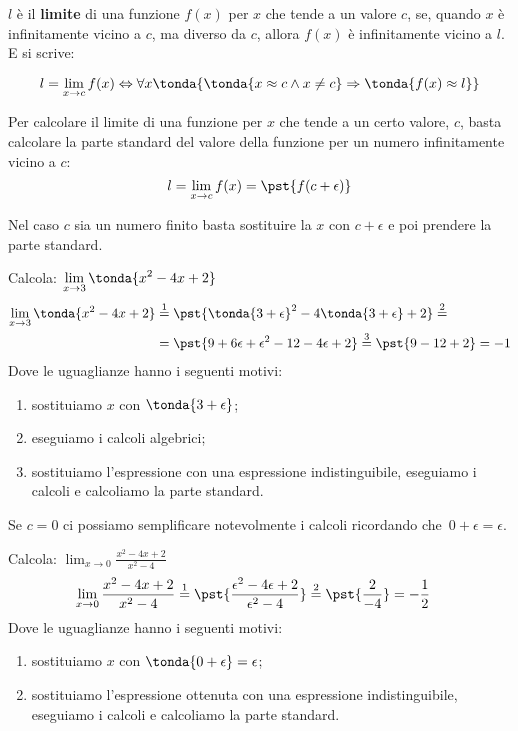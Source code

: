 \begin{definizione}
\(l\) è il \textbf{limite} di una funzione \(f(x)\) per \(x\) 
che tende a un 
valore \(c\), se, quando \(x\) è infinitamente vicino a \(c\), 
ma diverso da \(c\), 
allora \(f(x)\) è infinitamente vicino a \(l\). E si scrive:

\[l=\lim_{x \rightarrow c} f(x) \Leftrightarrow 
\forall x \tonda{\tonda{x \approx c \wedge x \neq c} \Rightarrow 
\tonda{f(x) \approx l}}\]
\end{definizione}

Per calcolare il limite di una funzione per $x$ che tende a un certo 
valore, $c$, basta calcolare la parte standard del valore della funzione 
per un numero infinitamente vicino a $c$:
\[l=\lim_{x \rightarrow c} f(x) = \pst{f(c+\epsilon)}\]

Nel caso $c$ sia un numero finito basta sostituire la $x$ con $c+\epsilon$ 
e poi prendere la parte standard.

\begin{esempio}
Calcola: \quad \(\displaystyle \lim_{x \rightarrow 3} \tonda{x^2-4x+2}\)
\begin{align*}
\lim_{x \rightarrow 3} \tonda{x^2-4x+2} & \stackrel{1}{=} 
  \pst{\tonda{3+\epsilon}^2-4\tonda{3+\epsilon}+2} \stackrel{2}{=}\\  
  & =\pst{9 + 6 \epsilon + \epsilon^2 - 12 - 4\epsilon + 2} \stackrel{3}{=}
  \pst{9 - 12 + 2} = -1
\end{align*}
Dove le uguaglianze hanno i seguenti motivi:
\begin{enumerate} [nosep]
 \item sostituiamo $x$ con \(\tonda{3+\epsilon}\);
 \item eseguiamo i calcoli algebrici;
 \item sostituiamo l'espressione con una espressione indistinguibile,
   eseguiamo i calcoli e calcoliamo la parte standard.
\end{enumerate}
\end{esempio}

Se $c=0$ ci possiamo semplificare notevolmente i calcoli ricordando 
che~\(0 + \epsilon = \epsilon\).

\begin{esempio}
Calcola: \quad 
  \(\displaystyle \lim_{x \rightarrow 0} \frac{x^2-4x+2}{x^2-4}\)
\begin{align*}
\lim_{x \rightarrow 0} \frac{x^2-4x+2}{x^2-4} & \stackrel{1}{=} 
  \pst{\frac{\epsilon^2-4\epsilon+2}{\epsilon^2-4}} \stackrel{2}{=}  
  \pst{\frac{2}{-4}} = -\frac{1}{2}
\end{align*}
Dove le uguaglianze hanno i seguenti motivi:
\begin{enumerate} [nosep]
 \item sostituiamo $x$ con \(\tonda{0+\epsilon}=\epsilon\);
 \item sostituiamo l'espressione ottenuta con una espressione 
   indistinguibile, eseguiamo i calcoli e calcoliamo la parte standard.
\end{enumerate}
\end{esempio}

